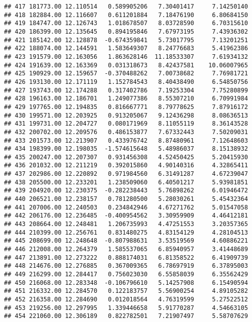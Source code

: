\documentclass[
]{article}
\begin{document}
\begin{verbatim}
## 417 181773.00 12.110514   0.589905206   7.30401417     7.14250140
## 418 182884.00 12.116607   0.611201884   7.18476190     6.80684150
## 419 184747.00 12.126743   1.018678507   8.03728590     6.70315610
## 420 186399.00 12.135645   0.894195846   7.67973195     7.43936302
## 421 185142.00 12.128878  -0.674359841   5.73017795     7.13201251
## 422 188074.00 12.144591   1.583649307   8.24776683     5.41962386
## 423 191579.00 12.163056   1.863628146  11.18533307     7.61934132
## 424 191639.00 12.163369   0.031318673   8.42437581    10.06007965
## 425 190929.00 12.159657  -0.370488262   7.00738682     7.76981721
## 426 193130.00 12.171119   1.152784543   8.40438490     6.54850756
## 427 193743.00 12.174288   0.317402786   7.19253304     7.75280899
## 428 196163.00 12.186701   1.249077386   8.55307210     6.70991984
## 429 197765.00 12.194835   0.816667771   8.79778625     7.87916172
## 430 199571.00 12.203925   0.913205067   9.12436298     8.08636513
## 431 199731.00 12.204727   0.080171969   8.11055119     8.36143528
## 432 200702.00 12.209576   0.486153877   7.67332443     7.50209031
## 433 201573.00 12.213907   0.433976742   8.87480961     7.12648603
## 434 198399.00 12.198035  -1.574615648   5.48986037     8.15138932
## 435 200247.00 12.207307   0.931456308   4.52450425     5.20415930
## 436 201032.00 12.211219   0.392015860   4.90140316     4.32865411
## 437 202986.00 12.220892   0.971984560   6.31491287     4.67239047
## 438 205500.00 12.233201   1.238509060   6.40501217     5.93981851
## 439 204920.00 12.230375  -0.282238443   5.76898262     6.01946472
## 440 206521.00 12.238157   0.781280500   5.28030261     5.45432364
## 441 207006.00 12.240503   0.234842946   4.67271762     5.01547058
## 442 206176.00 12.236485  -0.400954562   3.30959909     4.46412181
## 443 208664.00 12.248481   1.206735993   4.47251553     3.20357365
## 444 210399.00 12.256761   0.831480275   4.83154129     4.28104513
## 445 208699.00 12.248648  -0.807988631   3.53519569     4.60886221
## 446 212008.00 12.264379   1.585537065   6.85940957     3.41448689
## 447 213891.00 12.273222   0.888174031   6.81358522     6.41909739
## 448 214676.00 12.276885   0.367009365   6.78697919     6.37895003
## 449 216299.00 12.284417   0.756023030   6.55858039     6.35562429
## 450 216068.00 12.283348  -0.106796610   5.14257908     6.15490594
## 451 216332.00 12.284570   0.122183757   5.56900254     4.89105282
## 452 216358.00 12.284690   0.012018564   4.76319599     5.27522512
## 453 219256.00 12.297995   1.339446658   5.91770287     4.54663105
## 454 221060.00 12.306189   0.822782501   7.21907497     5.58707629

\end{verbatim}
\end{document}

